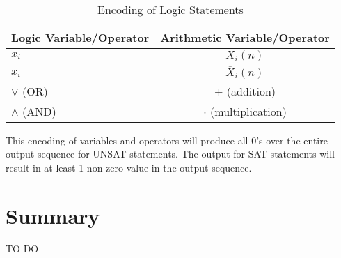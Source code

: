 \documentclass[reqno]{amsart}
\newtheorem{thm}{Theorem}[section]
\theoremstyle{definition}
\theoremstyle{remark}
\begin{document}
\begin{table}[h]
\centering
\def\arraystretch{1.2}
\begin{tabular}{|l|c|}
\hline
Logic Variable/Operator & Arithmetic Variable/Operator \\
\hline
$x_i$ & $X_i(n)$ \\
\hline
$\overline{x}_i$ & $\overline{X}_i(n)$ \\
\hline
$\vee $ (OR) & $+$ (addition) \\
\hline
$\wedge $ (AND) & $\cdot$ (multiplication) \\
\hline
\end{tabular}
\caption{Encoding of Logic Statements}
\label{tab:template}
\end{table}

\noindent
This encoding of variables and operators will produce all 0's over the entire output sequence 
for UNSAT statements. The output for SAT statements will result in at least 1 non-zero value 
in the output sequence.



\section{Summary}
TO DO











\end{document}
